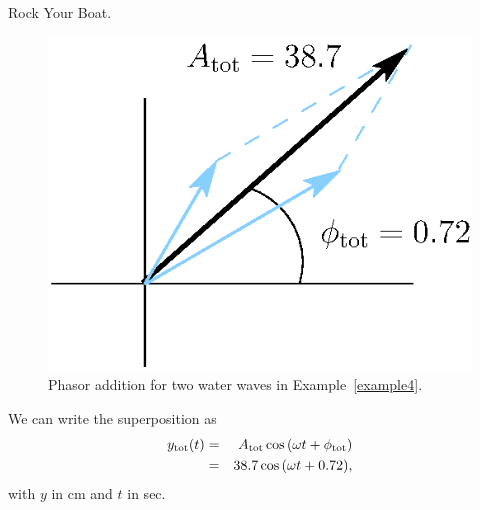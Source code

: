 \begin{example}{Rock Your Boat.}
\begin{solution}
\begin{figure}[b]
\begin{center}
 \includegraphics[width=2.0truein]{phasors/phasor11} 
\caption{\label{fig:phasor11}Phasor addition  for 
two water waves in Example~\ref{example4}.}
\end{center}
\end{figure}
We can write the superposition as
\begin{eqnarray*}
 y_{\rm tot}(t) & = & A_{\rm tot}\cos{(\omega t + \phi_{\rm tot})} \\
            & = & 38.7\cos{(\omega t + 0.72)}, \\
\end{eqnarray*}
with $y$ in cm and $t$ in sec.
\end{solution}
\end{example}
\newpage

